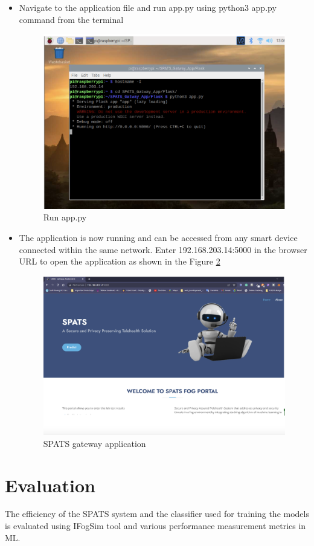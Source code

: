 \documentclass[10pt]{article}
\begin{document}
\begin{itemize}
\item Navigate to the application file and run app.py using python3 app.py command from the terminal
\begin{figure}[H]
    \begin{center}
        \includegraphics[width=0.7\linewidth, frame]{CA2-template/CM31.png}
       \caption{Run app.py \label{fig:21}}
    \end{center}
\end{figure}

\item The application is now running and can be accessed from any smart device connected within the same network. Enter 192.168.203.14:5000 in the browser URL to open the application as shown in the Figure \ref{fig:22}
\begin{figure}[H]
    \begin{center}
        \includegraphics[width=0.7\linewidth, frame]{CA2-template/CM32.png}
       \caption{SPATS gateway application \label{fig:22}}
    \end{center}
\end{figure}

\end{itemize}

\section{Evaluation}
The efficiency of the SPATS system and the classifier used for training the models is evaluated using IFogSim tool and various performance measurement metrics in ML.
\end{document}
